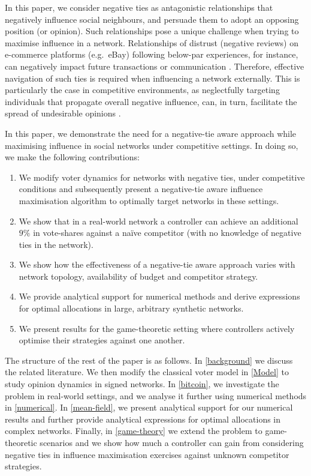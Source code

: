 In this paper, we consider negative ties as antagonistic relationships that negatively influence social neighbours, and persuade them to adopt an opposing position (or opinion).  
Such relationships pose a unique challenge when trying to maximise influence in a network. Relationships of distrust (negative reviews) on e-commerce platforms (e.g.~eBay) following below-par experiences, for instance, can negatively impact future transactions or communication \cite{borgs2010novel,chen2011influence}. Therefore, effective navigation of such ties is required when influencing a network externally. This is particularly the case in competitive environments, as neglectfully targeting individuals that propagate overall negative influence, can, in turn, facilitate the spread of undesirable opinions \cite{chen2018negative}.

In this paper, we demonstrate the need for a negative-tie aware approach while maximising influence in social networks under competitive settings. In doing so, we make the following contributions:
\begin{enumerate}
\item We modify voter dynamics for networks with negative ties, under competitive conditions and  subsequently present a negative-tie aware influence maximisation algorithm to optimally target networks in these settings.
\item We show that in a real-world network a controller can achieve an additional $9\%$ in vote-shares against a naïve competitor (with no knowledge of negative ties in the network).
\item We show how the effectiveness of a negative-tie aware approach varies with network topology, availability of budget and competitor strategy.
\item We provide analytical support for numerical methods and derive expressions for optimal allocations in large, arbitrary synthetic networks.
\item We present results for the game-theoretic setting where controllers actively optimise their strategies against one another. 
\end{enumerate}
The structure of the rest of the paper is as follows. In \cref{background} we discuss the related literature. We then modify the classical voter model in \cref{Model} to study opinion dynamics in signed networks. 
In \cref{bitcoin}, we investigate the problem in real-world settings, and we analyse it further using numerical methods in \cref{numerical}. In \cref{mean-field}, we present analytical support for our numerical results and further provide analytical expressions for optimal allocations in complex networks. Finally, in \cref{game-theory} we extend the problem to game-theoretic scenarios and we show how much a controller can gain from considering negative ties in influence maximisation exercises against unknown competitor strategies.

